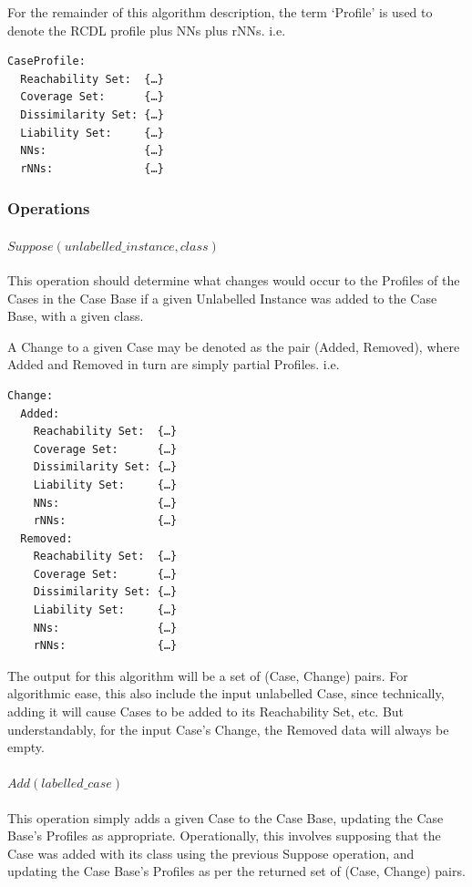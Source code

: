 \documentclass[a4paper,11pt]{report}
\begin{document}
For the remainder of this algorithm description, the term `Profile' is used to denote the RCDL profile plus NNs plus rNNs. i.e. 
\begin{verbatim}
CaseProfile:  
  Reachability Set:  {…}
  Coverage Set:      {…}
  Dissimilarity Set: {…}
  Liability Set:     {…}
  NNs:               {…}
  rNNs:              {…}
\end{verbatim}

\subsubsection{Operations}
\paragraph{$Suppose(unlabelled\_instance, class)$}
This operation should determine what changes would occur to the Profiles of the Cases in the Case Base if a given Unlabelled Instance was added to the Case Base, with a given class.

A Change to a given Case may be denoted as the pair (Added, Removed), where Added and Removed in turn are simply partial Profiles. i.e.
\begin{verbatim}
Change:
  Added:
    Reachability Set:  {…}
    Coverage Set:      {…}
    Dissimilarity Set: {…}
    Liability Set:     {…}
    NNs:               {…}
    rNNs:              {…}
  Removed:
    Reachability Set:  {…}
    Coverage Set:      {…}
    Dissimilarity Set: {…}
    Liability Set:     {…}
    NNs:               {…}
    rNNs:              {…}
\end{verbatim}

The output for this algorithm will be a set of (Case, Change) pairs. For algorithmic ease, this also include the input unlabelled Case, since technically, adding it will cause Cases to be added to its Reachability Set, etc. But understandably, for the input Case's Change, the Removed data will always be empty.

\paragraph{$Add(labelled\_case)$}
This operation simply adds a given Case to the Case Base, updating the Case Base's Profiles as appropriate. Operationally, this involves supposing that the Case was added with its class using the previous Suppose operation, and updating the Case Base's Profiles as per the returned set of (Case, Change) pairs.
\end{document}
